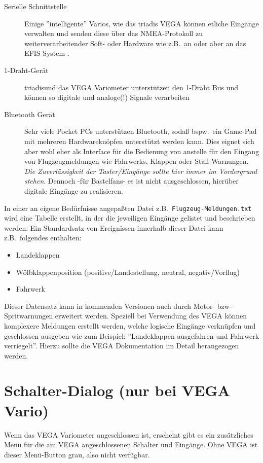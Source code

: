 \begin{description}
     \item[Serielle Schnittstelle]  Einige ''intelligente'' Varios, wie das \textsf{triadis} VEGA  können etliche Eingänge verwalten und senden diese über das NMEA-Protokoll zu weiterverarbeitender Soft- oder Hardware wie z.B.\ an \xc oder aber an das EFIS System \al.
     \item[1-Draht-Gerät]  \textsf{triadis}\al und das VEGA Variometer unterstützen den 1-Draht Bus und können so digitale und analoge(!) Signale verarbeiten
     \item[Bluetooth Gerät]  Sehr viele Pocket \textsf{PC}s unterstützen Bluetooth, sodaß bspw.\ ein Game-Pad mit mehreren  Hardwareknöpfen unterstützt werden kann. 
     Dies eignet sich aber wohl eher als Interface für die Bedienung von \xc anstelle für den Eingang von Flugzeugmeldungen wie Fahrwerks, Klappen oder Stall-Warnungen.
     \textsl{Die Zuverlässigkeit der Taster/Eingänge sollte hier immer im Vordergrund stehen}.
        Dennoch -für Bastelfans- es ist nicht ausgeschlossen, hierüber digitale Eingänge zu realisieren.
\end{description}

In einer an eigene Bedürfnisse angepaßten Datei z.B.\ \texttt{Flugzeug-Meldungen.txt} wird eine Tabelle erstellt, in der die jeweiligen Eingänge gelistet und beschrieben werden. Ein Standardsatz von Ereignissen innerhalb dieser Datei  kann z.B.\ folgendes enthalten:
\begin{itemize}
  \item Landeklappen
  \item Wölbklappenposition (positive/Landestellung, neutral, negativ/Vorflug)
  \item Fahrwerk
\end{itemize}

Dieser Datensatz kann in kommenden Versionen auch durch Motor- bzw- Spritwarnungen erweitert werden.
Speziell bei Verwendung des VEGA können komplexere Meldungen erstellt werden, welche logische Eingänge verknüpfen und geschlossen ausgeben wie zum Beispiel: ''Landeklappen ausgefahren und Fahrwerk verriegelt''. 
Hierzu sollte die VEGA Dokumentation im Detail herangezogen werden.
\section{Schalter-Dialog (\textbf{nur} bei VEGA Vario)}

Wenn das VEGA Variometer angeschlossen ist, erscheint gibt es ein zusätzliches
Menü für die am VEGA angeschlossenen Schalter und Eingänge. Ohne VEGA ist dieser Menü-Button grau, also nicht verfügbar. 


